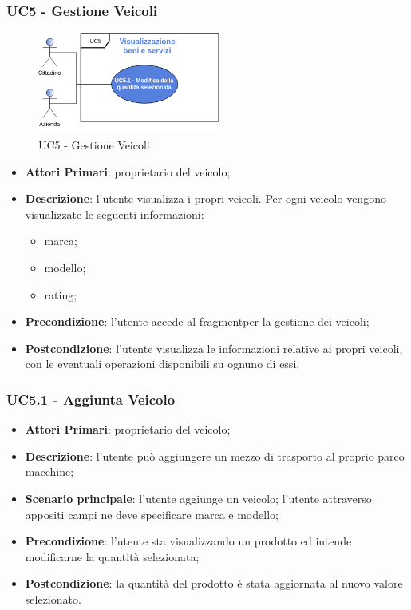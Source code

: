  \subsubsection{UC5 - Gestione Veicoli}
  \begin{figure}[H]
 	\includegraphics[width=6cm]{res/images/UC5-Generale.png}
 	\centering
 	\caption{UC5 - Gestione Veicoli}
 \end{figure}
 \begin{itemize}
 	\item \textbf{Attori Primari}: proprietario del veicolo;
 	\item \textbf{Descrizione}: l'utente visualizza i propri veicoli. Per ogni veicolo vengono visualizzate le seguenti informazioni:
 	\begin{itemize}
 		\item marca;
 		\item modello;
 		\item rating;
 	\end{itemize}
 	\item \textbf{Precondizione}: l'utente accede al fragment\glosp per la gestione dei veicoli;
 	\item \textbf{Postcondizione}: l'utente visualizza le informazioni relative ai propri veicoli, con le eventuali operazioni disponibili su ognuno di essi.
 \end{itemize}
 \subsubsection{UC5.1 - Aggiunta Veicolo}
 \begin{itemize}
 	\item \textbf{Attori Primari}: proprietario del veicolo;
 	\item \textbf{Descrizione}: l'utente può aggiungere un mezzo di trasporto al proprio parco macchine;
 	\item \textbf{Scenario principale}: l'utente aggiunge un veicolo; l'utente attraverso appositi campi ne deve specificare marca e modello;
 	\item \textbf{Precondizione}: l'utente sta visualizzando un prodotto ed intende modificarne la quantità selezionata;
 	\item \textbf{Postcondizione}: la quantità del prodotto è stata aggiornata al nuovo valore selezionato.
 \end{itemize}